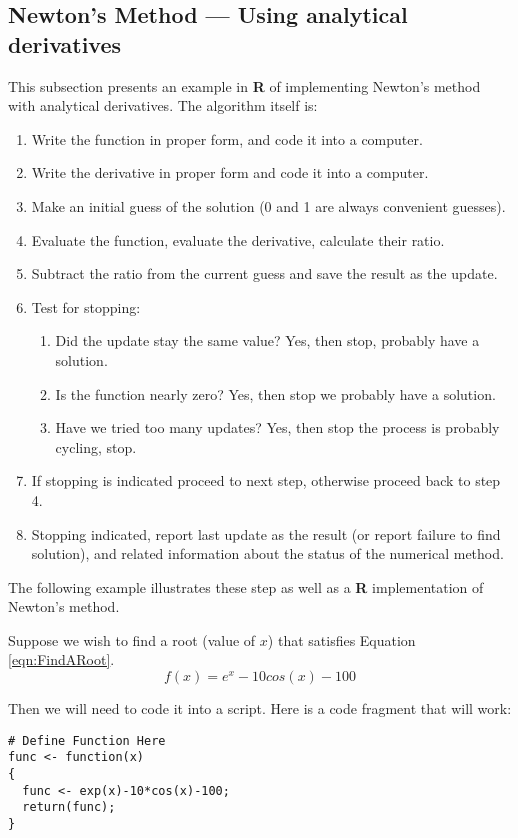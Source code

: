 \subsection{Newton's Method --- Using analytical derivatives}
This subsection presents an example in \textbf{R} of implementing Newton's method with analytical derivatives.   
The algorithm itself is:
\begin{enumerate}
\item Write the function in proper form, and code it into a computer.
\item Write the derivative in proper form and code it into a computer.
\item Make an initial guess of the solution (0 and 1 are always convenient guesses).
\item Evaluate the function, evaluate the derivative, calculate their ratio.
\item Subtract the ratio from the current guess and save the result as the update.
\item Test for stopping:
\begin{enumerate}
\item Did the update stay the same value? Yes, then stop, probably have a solution.
\item Is the function nearly zero?  Yes, then stop we probably have a solution.
\item Have we tried too many updates? Yes, then stop the process is probably cycling, stop.
\end{enumerate}
\item If stopping is indicated proceed to next step, otherwise proceed back to step 4.
\item Stopping indicated, report last update as the result (or report failure to find solution), and related information about the status of the numerical method.
\end{enumerate}

The following example illustrates these step as well as a \textbf{R} implementation of Newton's method.

Suppose we wish to find a root (value of $x$) that satisfies Equation \ref{eqn:FindARoot}.
\begin{equation}
f(x) = e^x - 10 cos(x) -100
\label{eqn:FindARoot}
\end{equation}

Then we will need to code it into a script.   Here is a code fragment that will work:
\begin{lstlisting}[caption=R code fragment for the function calculation, label=lst:NewtonsFunction]
# Define Function Here
func <- function(x)
{
  func <- exp(x)-10*cos(x)-100;
  return(func);
}
\end{lstlisting}

